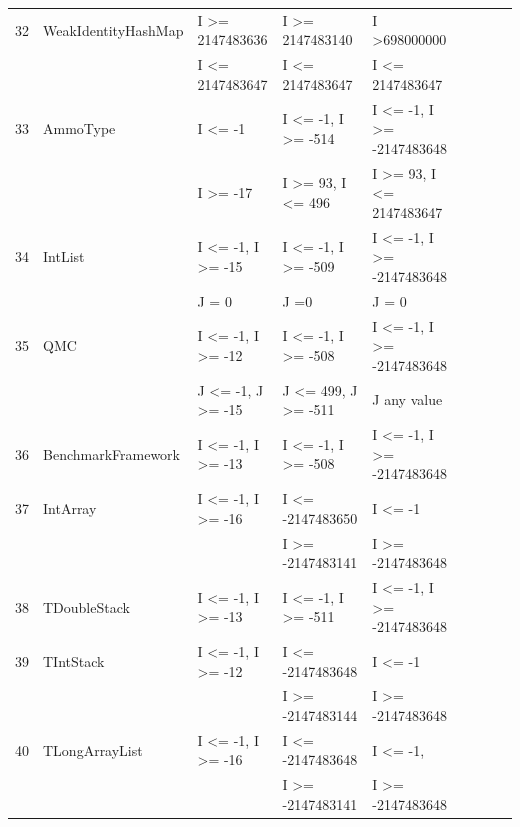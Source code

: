 \documentclass[runningheads,a4paper]{llncs}
\begin{document}
\begin{table}[h]
{{\begin{tabular}{|l|l|l|l|l|l|l|l|l|}
32	& WeakIdentityHashMap		& I \textgreater= 2147483636				& I \textgreater= 2147483140			& I \textgreater 698000000					\\ 
	&                                             & I \textless= 2147483647					& I \textless= 2147483647				& I \textless= 2147483647					\\
33	& AmmoType				& I \textless= -1								& I \textless= -1, I \textgreater= -514		& I \textless= -1, I \textgreater= -2147483648	\\ 			
	&                                             & I \textgreater= -17							& I \textgreater= 93, I \textless= 496		& I \textgreater= 93, 	I \textless= 2147483647	\\
34	& IntList						& I \textless= -1, I \textgreater= -15			& I \textless= -1, I \textgreater= -509		& I \textless= -1, I \textgreater= -2147483648	\\ 		
	&                                             & J = 0										& J =0									& J = 0		   								\\
35	& QMC						& I \textless= -1, I \textgreater= -12			& I \textless= -1, I \textgreater= -508		& I \textless= -1, I \textgreater= -2147483648	\\ 
	&                                             & J \textless= -1, J \textgreater= -15			& J \textless= 499, J \textgreater= -511	& J any value			 		  				\\	
36	& BenchmarkFramework		& I \textless= -1, I \textgreater= -13			& I \textless= -1, I \textgreater= -508		& I \textless= -1, I \textgreater= -2147483648	\\ 
37	& IntArray					& I \textless= -1, I \textgreater= -16			& I \textless= -2147483650				& I \textless= -1								\\ 
	&							&											& I \textgreater= -2147483141			&  I \textgreater= -2147483648				\\
38	& TDoubleStack				& I \textless= -1, I \textgreater= -13			& I \textless= -1, I \textgreater= -511		& I \textless= -1, I \textgreater= -2147483648	\\ 
39	& TIntStack					& I \textless= -1, I \textgreater= -12			& I \textless= -2147483648		 		& I \textless= -1 							\\ 
	&							&											& I \textgreater= -2147483144			& I \textgreater= -2147483648				\\
40	& TLongArrayList				& I \textless= -1, I \textgreater= -16			& I \textless= -2147483648 				& I \textless= -1, 							\\ 
	&							&											& I \textgreater= -2147483141			& I \textgreater= -2147483648				\\

\end{tabular}}}
\end{table}
\end{document}
